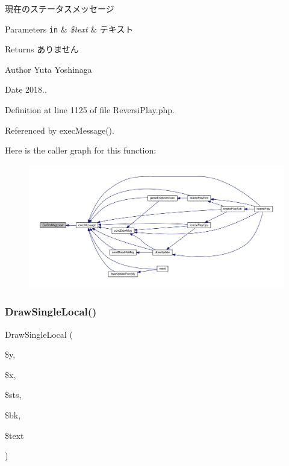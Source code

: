 現在のステータスメッセージ 


\begin{DoxyParams}[1]{Parameters}
\mbox{\tt in}  & {\em \$text} & テキスト \\
\hline
\end{DoxyParams}
\begin{DoxyReturn}{Returns}
ありません 
\end{DoxyReturn}
\begin{DoxyAuthor}{Author}
Yuta Yoshinaga 
\end{DoxyAuthor}
\begin{DoxyDate}{Date}
2018.. 
\end{DoxyDate}


Definition at line 1125 of file Reversi\+Play.\+php.



Referenced by exec\+Message().

Here is the caller graph for this function\+:\nopagebreak
\begin{figure}[H]
\begin{center}
\leavevmode
\includegraphics[width=350pt]{class_reversi_play_ae3da8fb1a3a365c6e5254e5cf6f1e7bc_icgraph}
\end{center}
\end{figure}
\mbox{\label{class_reversi_play_af0649b9d4a899e0802c739928136de99}} 
\subsubsection{\texorpdfstring{Draw\+Single\+Local()}{DrawSingleLocal()}}
{\footnotesize\ttfamily Draw\+Single\+Local (\begin{DoxyParamCaption}\item[{}]{\$y,  }\item[{}]{\$x,  }\item[{}]{\$sts,  }\item[{}]{\$bk,  }\item[{}]{\$text }\end{DoxyParamCaption})\hspace{0.3cm}{\ttfamily [private]}}



